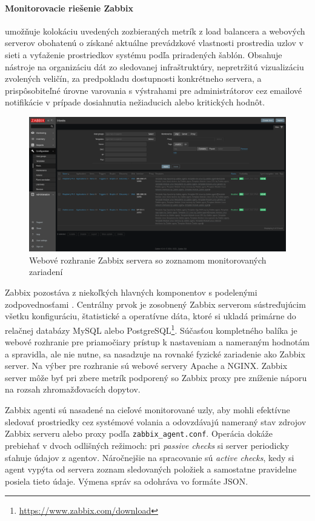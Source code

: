\documentclass[12pt, a4paper]{article}
\begin{document}
\paragraph{Monitorovacie riešenie Zabbix} umožňuje kolokáciu uvedených zozbieraných metrík z load balancera
a webových serverov obohatenú o získané aktuálne prevádzkové vlastnosti prostredia uzlov v sieti
a vyťaženie prostriedkov systému podľa priradených šablón. Obsahuje nástroje na organizáciu dát zo 
sledovanej infraštruktúry, nepretržitú vizualizáciu zvolených veličín, za predpokladu dostupnosti 
konkrétneho servera, a prispôsobiteľné úrovne varovania s výstrahami pre administrátorov cez emailové 
notifikácie v prípade dosiahnutia nežiaducich alebo kritických hodnôt.
\begin{figure}[h]
	\centering
  	\includegraphics[width=\textwidth]{images/zabbix-host-config.png}
  	\caption{Webové rozhranie Zabbix servera so zoznamom monitorovaných zariadení}
\end{figure}

Zabbix pozostáva z niekoľkých hlavných komponentov s podelenými zodpovednosťami \cite{zabbix-monitoring}.
Centrálny prvok je zosobnený Zabbix serverom sústreďujúcim všetku konfiguráciu, štatistické a operatívne 
dáta, ktoré si ukladá primárne do relačnej databázy MySQL alebo PostgreSQL\footnote{
\url{https://www.zabbix.com/download}}. Súčasťou kompletného balíka je webové rozhranie pre priamočiary 
prístup k nastaveniam a nameraným hodnotám a spravidla, ale nie nutne, sa nasadzuje na rovnaké fyzické 
zariadenie ako Zabbix server. Na výber pre rozhranie sú webové servery Apache a NGINX. Zabbix server môže 
byť pri zbere metrík podporený so Zabbix proxy pre zníženie náporu na rozsah zhromažďovacích dopytov. 

Zabbix agenti sú nasadené na cieľové monitorované uzly, aby mohli efektívne sledovať prostriedky cez 
systémové volania a odovzdávajú nameraný stav zdrojov Zabbix serveru alebo proxy podľa 
\verb|zabbix_agent.conf|. Operácia dokáže prebiehať v dvoch odlišných režimoch: pri \emph{passive checks}
si server periodicky sťahuje údajov z agentov. Náročnejšie na spracovanie sú \emph{active checks}, kedy
si agent vypýta od servera zoznam sledovaných položiek a samostatne pravidelne posiela tieto údaje. Výmena 
správ sa odohráva vo formáte JSON.
\end{document}
